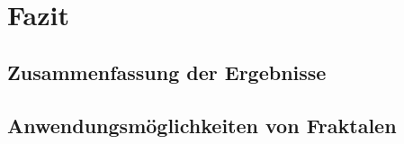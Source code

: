 \chapter{Fazit}
\thispagestyle{fancy} %

\section{Zusammenfassung der Ergebnisse}
\blindtext 


\section{Anwendungsmöglichkeiten von Fraktalen}
\blindtext 
